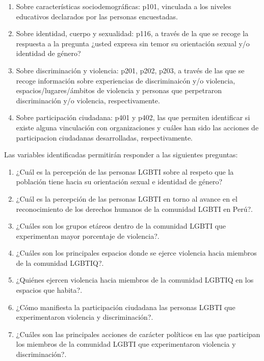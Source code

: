 \documentclass[
]{book}
\providecommand{\tightlist}{%
  \setlength{\itemsep}{0pt}\setlength{\parskip}{0pt}}
\theoremstyle{definition}
\theoremstyle{definition}
\theoremstyle{definition}
\theoremstyle{definition}
\theoremstyle{remark}
\begin{document}
\begin{enumerate}
\def\labelenumi{\arabic{enumi}.}
\tightlist
\item
  Sobre características sociodemográficas: p101, vinculada a los niveles educativos declarados por las personas encuestadas.
\item
  Sobre identidad, cuerpo y sexualidad: p116, a través de la que se recoge la respuesta a la pregunta ¿usted expresa sin temor su orientación sexual y/o identidad de género?
\item
  Sobre discriminación y violencia: p201, p202, p203, a través de las que se recoge información sobre experiencias de discriminaicón y/o violencia, espacios/lugares/ámbitos de violencia y personas que perpetraron discriminación y/o violencia, respectivamente.
\item
  Sobre participación ciudadana: p401 y p402, las que permiten identificar si existe alguna vinculación con organizaciones y cuáles han sido las acciones de participacion ciudadanas desarrolladas, respectivamente.
\end{enumerate}

Las variables identificadas permitirán responder a las siguientes preguntas:

\begin{enumerate}
\def\labelenumi{\arabic{enumi}.}
\tightlist
\item
  ¿Cuál es la percepción de las personas LGBTI sobre al respeto que la población tiene hacia su orientación sexual e identidad de género?
\item
  ¿Cuál es la percepción de las personas LGBTI en torno al avance en el reconocimiento de los derechos humanos de la comunidad LGBTI en Perú?.
\item
  ¿Cuáles son los grupos etáreos dentro de la comunidad LGBTI que experimentan mayor porcentaje de violencia?.
\item
  ¿Cuáles son los principales espacios donde se ejerce violencia hacia miembros de la comunidad LGBTIQ?.
\item
  ¿Quiénes ejercen violencia hacia miembros de la comunidad LGBTIQ en los espacios que habita?.
\item
  ¿Cómo manifiesta la participación ciudadana las personas LGBTI que experimentaron violencia y discriminación?.
\item
  ¿Cuáles son las principales acciones de carácter políticos en las que participan los miembros de la comunidad LGBTI que experimentaron violencia y discriminación?.
\end{enumerate}
\end{document}
